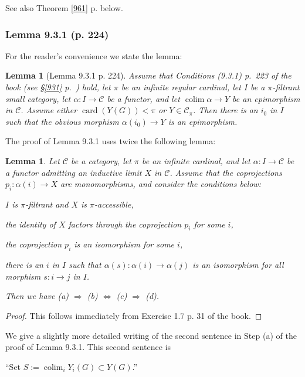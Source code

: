 \documentclass[12pt]{article}%
\newtheorem{lem}[thm]{Lemma}
\theoremstyle{remark}
\theoremstyle{definition}
\newcommand{\nn}{\noindent}
\newcommand{\C}{\mathcal C}
\newcommand{\ssi}{\Leftrightarrow}%
\newcommand{\then}{\Rightarrow}
\DeclareMathOperator*{\colim}{colim}%
\DeclareMathOperator{\card}{card}%
\begin{document}
See also Theorem \ref{961} p. \pageref{961} below.

%

\subsubsection{Lemma 9.3.1 (p. 224)}

For the reader's convenience we state the lemma:

\begin{lem}[Lemma 9.3.1 p. 224]\label{l331}
Assume that Conditions (9.3.1) p.~223 of the book (see \S\ref{931} p.~\pageref{931}) hold, let $\pi$ be an infinite regular cardinal, let $I$ be a $\pi$-filtrant small category, let $\alpha:I\to\C$ be a functor, and let $\colim\alpha\to Y$ be an epimorphism in $\C$. Assume either $\card(Y(G))<\pi$ or $Y\in\C_\pi$. Then there is an $i_0$ in $I$ such that the obvious morphism $\alpha(i_0)\to Y$ is an epimorphism.
\end{lem}

The proof of Lemma 9.3.1 uses twice the following lemma:

\begin{lem}\label{ppi}
Let $\C$ be a category, let $\pi$ be an infinite cardinal, and let $\alpha:I\to\C$ be a functor admitting an inductive limit $X$ in $\C$. Assume that the coprojections $p_i:\alpha(i)\to X$ are monomorphisms, and consider the conditions below:

\nn{\em(a)} $I$ is $\pi$-filtrant and $X$ is $\pi$-accessible,

\nn{\em(b)} the identity of $X$ factors through the coprojection $p_i$ for some $i$,

\nn{\em(c)} the coprojection $p_i$ is an isomorphism for some $i$,

\nn{\em(d)} there is an $i$ in $I$ such that $\alpha(s):\alpha(i)\to\alpha(j)$ is an isomorphism for all morphism $s:i\to j$ in $I$.

\nn Then we have {\em(a)} $\then$ {\em(b)} $\ssi$ {\em(c)} $\then$ {\em(d)}. 
\end{lem}

\begin{proof}
This follows immediately from Exercise 1.7 p. 31 of the book.
\end{proof}

We give a slightly more detailed writing of the second sentence in Step (a) of the proof of Lemma 9.3.1. This second sentence is 

``Set $S:=\colim_iY_i(G)\subset Y(G)$.'' 
\end{document}
